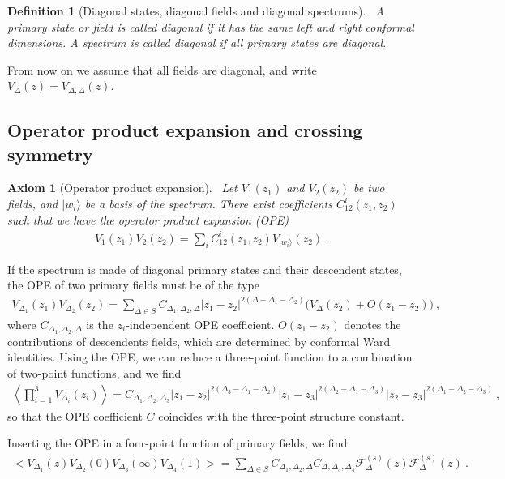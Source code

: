 \documentclass[12pt, a4paper]{article}
\theoremstyle{break}
\newtheorem{hyp}[exo]{Axiom}
\newtheorem{defn}[exo]{Definition}
\begin{document}
\begin{defn}[Diagonal states, diagonal fields and diagonal spectrums]
 ~\label{def:diag}
 A primary state or field is called diagonal if it has the same left and right conformal dimensions. A spectrum is called diagonal if all primary states are diagonal.
\end{defn}
From now on we assume that all fields are diagonal, and write  $V_\Delta(z) = V_{\Delta,\Delta}(z)$.

\subsection{Operator product expansion and crossing symmetry}

\begin{hyp}[Operator product expansion]
 ~\label{hyp:ope}
 Let $V_1(z_1)$ and $V_2(z_2)$ be two fields, and $|w_i\rangle$ be a basis of the spectrum.
 There exist coefficients $C^i_{12}(z_1,z_2)$ such that we have the operator product expansion (OPE) 
 \begin{align}
  V_1(z_1)V_2(z_2) = \sum_i C^i_{12}(z_1,z_2) V_{|w_i\rangle}(z_2)\ .
 \end{align}
\end{hyp}
If the spectrum is made of diagonal primary states and their descendent states, the OPE of two primary fields must be of the type
\begin{align}
 V_{\Delta_1}(z_1) V_{\Delta_2}(z_2) 
 = \sum_{\Delta\in S} C_{\Delta_1,\Delta_2,\Delta} |z_1-z_2|^{2(\Delta-\Delta_1-\Delta_2)}
 \Big(V_{\Delta}(z_2) + O(z_1-z_2) \Big)\ ,
 \label{eq:ope}
\end{align}
where $C_{\Delta_1,\Delta_2,\Delta}$ is the $z_i$-independent OPE coefficient. 
$O(z_1-z_2)$ denotes the contributions of descendents fields, which are determined by conformal Ward identities.
Using the OPE, we can reduce a three-point function to a combination of two-point functions, and we find 
\begin{align}
 \left<\prod_{i=1}^3 V_{\Delta_i}(z_i) \right> = C_{\Delta_1,\Delta_2,\Delta_3} |z_1-z_2|^{2(\Delta_3-\Delta_1-\Delta_2)} |z_1-z_3|^{2(\Delta_2-\Delta_1-\Delta_3)} |z_2-z_3|^{2(\Delta_1-\Delta_2-\Delta_3)}\ ,
\end{align}
so that the OPE coefficient $C$ coincides with the three-point structure constant.

Inserting the OPE in a four-point function of primary fields, we find
\begin{align}
\Big<V_{\Delta_1}(z)V_{\Delta_2}(0)V_{\Delta_3}(\infty)V_{\Delta_4}(1)\Big>
 =\sum_{\Delta\in S} C_{\Delta_1,\Delta_2,\Delta} C_{\Delta,\Delta_3,\Delta_4}  \mathcal{F}^{(s)}_\Delta(z) \mathcal{F}^{(s)}_\Delta(\bar z)\ .
 \label{sdec}
\end{align}
\end{document}
